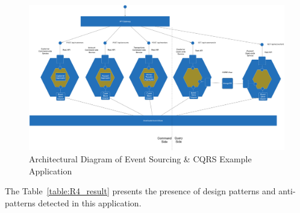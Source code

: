 \documentclass{Configuration_Files/PoliMi3i_thesis}
\begin{document}
\begin{figure}[H]
\centering
\includegraphics[width=1\textwidth]{myImages/R4.png}
\caption{Architectural Diagram of Event Sourcing \& CQRS Example Application}
\label{fig:R4_arch}
\end{figure}

The Table~\ref{table:R4_result} presents the presence of design patterns and anti-patterns detected in this application.
\end{document}
